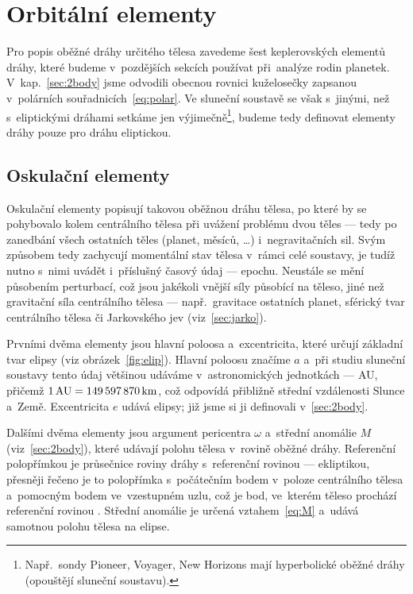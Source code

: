 \documentclass[A4paper, 12pt, oneside, openany]{book}
\begin{document}
\pagebreak
\section{Orbitální elementy} \label{sec:orbelem}
Pro popis oběžné dráhy určitého tělesa zavedeme šest keplerovských elementů dráhy, které budeme v~pozdějších sekcích používat při~analýze rodin planetek. V~kap.~\ref{sec:2body} jsme odvodili obecnou rovnici kuželosečky zapsanou v~polárních souřadnicích~\eqref{eq:polar}. Ve sluneční soustavě se však s~jinými, než s~eliptickými dráhami setkáme jen výjimečně\footnote{Např.\ sondy Pioneer, Voyager, New Horizons mají hyperbolické oběžné dráhy (opouštějí sluneční soustavu).}, budeme tedy definovat elementy dráhy pouze pro dráhu eliptickou.
\subsection{Oskulační elementy}
Oskulační elementy popisují takovou oběžnou dráhu tělesa, po které by se pohybovalo kolem centrálního tělesa při uvážení problému dvou těles --- tedy po zanedbání všech ostatních těles (planet, měsíců, \ldots) i~negravitačních sil. Svým způsobem tedy zachycují momentální stav tělesa v~rámci celé soustavy, je tudíž nutno s~nimi uvádět i~příslušný časový údaj --- epochu. Neustále se mění působením perturbací, což jsou jakékoli vnější síly působící na těleso, jiné než gravitační síla centrálního tělesa --- např.\ gravitace ostatních planet, sférický tvar centrálního tělesa či Jarkovského jev (viz~\ref{sec:jarko}).

Prvními dvěma elementy jsou hlavní poloosa a~excentricita, které určují základní tvar elipsy (viz obrázek~\ref{fig:elip}). Hlavní poloosu značíme $a$ a~při studiu sluneční soustavy tento údaj většinou udáváme v~astronomických jednotkách --- AU, přičemž $1\, {\rm AU} = 149\,597\,870\,{\rm km}$, což odpovídá přibližně střední vzdálenosti Slunce a~Země. Excentricita $e$ udává  elipsy; již jsme si ji definovali v~\ref{sec:2body}.

Dalšími dvěma elementy jsou argument pericentra $\omega$ a~střední anomálie $M$ (viz~\ref{sec:2body}), které udávají polohu tělesa v~rovině oběžné dráhy. Referenční polopřímkou je průsečnice roviny dráhy s~referenční rovinou --- ekliptikou, přesněji řečeno je to polopřímka s~počátečním bodem v~poloze centrálního tělesa a~pomocným bodem ve~vzestupném uzlu, což je bod, ve~kterém těleso prochází referenční rovinou . Střední anomálie je určená vztahem~\eqref{eq:M} a~udává samotnou polohu tělesa na elipse.
\end{document}
